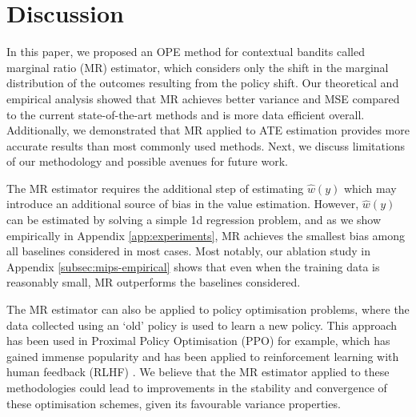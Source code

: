 \section{Discussion}

In this paper, we proposed an OPE method for contextual bandits called marginal ratio (MR) estimator, which considers only the shift in the marginal distribution of the outcomes resulting from the policy shift. Our theoretical and empirical analysis showed that MR achieves better variance and MSE compared to the current state-of-the-art methods and is more data efficient overall. Additionally, we demonstrated that MR applied to ATE estimation provides more accurate results than most commonly used methods. Next, we discuss limitations of our methodology and possible avenues for future work.

The MR estimator requires the additional step of estimating $\hat{w}(y)$ which may introduce an additional source of bias in the value estimation. However, $\hat{w}(y)$ can be estimated by solving a simple 1d regression problem, and as we show empirically in Appendix \ref{app:experiments}, MR achieves the smallest bias among all baselines considered in most cases. Most notably, our ablation study in Appendix \ref{subsec:mips-empirical} shows that even when the training data is reasonably small, MR outperforms the baselines considered. 


The MR estimator can also be applied to policy optimisation problems, where the data collected using an `old' policy is used to learn a new policy. This approach has been used in Proximal Policy Optimisation (PPO) \citep{schulman2017proximal} for example, which has gained immense popularity and has been applied to reinforcement learning with human feedback (RLHF) \citep{lambert2022illustrating}. We believe that the MR estimator applied to these methodologies could lead to improvements in the stability and convergence of these optimisation schemes, given its favourable variance properties.

